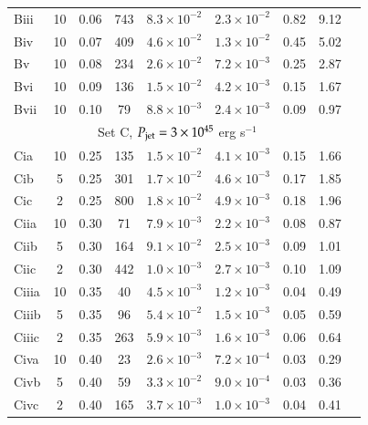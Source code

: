 \begin{table}
\begin{tabular}{l * {8}{c}}
	Biii	&  10 & 0.06 &   743 &  	$8.3\times10^{-2}$	& $2.3\times10^{-2}$		& 0.82	 	& 9.12	 \\
	Biv	& 10 &  0.07 &  409 &  	$4.6\times10^{-2}$	& $1.3\times10^{-2}$	 	& 0.45	 	& 5.02	  \\
	Bv	& 10 & 0.08 &  234 & 	$2.6\times10^{-2}$	&	 $7.2\times10^{-3}$ 		&	0.25	 	& 	2.87	 \\
	Bvi	&  10 &  0.09   &   136  &  $1.5\times10^{-2}$	& $4.2\times10^{-3}$	 	&	0.15	  	& 1.67	 \\
	Bvii	&  10 &  0.10   &    79 &   $8.8\times10^{-3}$	& $2.4\times10^{-3}$ 		& 	0.09	  	& 	0.97	 \\
	\hline
        \multicolumn{8}{c}{Set C, $P_{\rm{jet}}=3\times10^{45}$ erg s$^{-1}$} \\
        \hline
	Cia	&10 & 0.25 & 135 & $1.5\times10^{-2}$  & 	$4.1\times10^{-3}$			&	0.15		 	& 	1.66	 \\
	
   Cib  &5 & 0.25 & 301 & $1.7\times10^{-2}$  	&	$4.6\times10^{-3}$ 	   			&	0.17	 		& 	1.85		\\
   Cic  &2 & 0.25 & 800 & $1.8\times10^{-2}$   	&	$4.9\times10^{-3}$	 			&	0.18	  		&	1.96		\\	
    
	Ciia 	& 10 & 0.30 &  71 &  $7.9\times10^{-3}$ 	& $2.2\times10^{-3}$	 		&	0.08	 		& 0.87 	  	\\
    
    Ciib    &5 & 0.30 & 164 & $9.1\times10^{-2}$  & $2.5\times10^{-3}$ 	  			&	0.09	 		& 1.01	 \\
    Ciic    &2 & 0.30 & 442 & $1.0\times10^{-3}$  	&	$2.7\times10^{-3}$    		&	0.10		& 1.09	 \\

	Ciiia 	& 10 & 0.35 &  40 &  $4.5\times10^{-3}$  	& $1.2\times10^{-3}$	 		&	0.04			& 0.49  \\

   Ciiib    &5 & 0.35 & 96 & $5.4\times10^{-2}$ 	&	$1.5\times10^{-3}$ 	   			&	0.05			&	0.59		\\
    Ciiic   &2 & 0.35 & 263 & $5.9\times10^{-3}$   &	$1.6\times10^{-3}$ 	 			&	0.06	  		& 0.64		\\

	Civa	& 10 &  0.40 & 23 & $2.6\times10^{-3}$ 	& $7.2\times10^{-4}$			&	0.03	    	& 0.29	 \\

    Civb    &5 & 0.40 & 59 & $3.3\times10^{-2}$  	& $9.0\times10^{-4}$	   		&	0.03		& 0.36	 \\
    Civc  &2 & 0.40 & 165 & $3.7\times10^{-3}$   	& $1.0\times10^{-3}$	  		&	0.04	 	& 0.41	 \\


\end{tabular}
\end{table}
